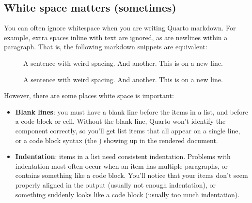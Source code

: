 \documentclass[
  letterpaper,
  DIV=11,
  numbers=noendperiod,
  oneside]{scrreprt}
\newenvironment{Shaded}{\begin{snugshade}}{\end{snugshade}}
\newcommand{\NormalTok}[1]{\textcolor[rgb]{0.00,0.23,0.31}{#1}}
\begin{document}
\begin{tcolorbox}
\subsection{White space matters
(sometimes)}\label{white-space-matters-sometimes}

You can often ignore whitespace when you are writing Quarto markdown.
For example, extra spaces inline with text are ignored, as are newlines
within a paragraph. That is, the following markdown snippets are
equivalent:

\begin{figure}[H]

\begin{minipage}[t]{0.50\linewidth}

\begin{Shaded}
\begin{Highlighting}[]
\NormalTok{A sentence  with   weird     spacing.   And    another.}
\NormalTok{This is on a new line.}
\end{Highlighting}
\end{Shaded}

\end{minipage}%
%
\begin{minipage}[t]{0.50\linewidth}

\begin{Shaded}
\begin{Highlighting}[]
\NormalTok{A sentence with weird spacing. And another. This is on a new line.}
\end{Highlighting}
\end{Shaded}

\end{minipage}%

\end{figure}%

However, there are some places white space is important:

\begin{itemize}
\item
  \textbf{Blank lines}: you must have a blank line before the items in a
  list, and before a code block or cell. Without the blank line, Quarto
  won't identify the component correctly, so you'll get list items that
  all appear on a single line, or a code block syntax (the
  \texttt{\textasciigrave{}\textasciigrave{}\textasciigrave{}}) showing
  up in the rendered document.
\item
  \textbf{Indentation}: items in a list need consistent indentation.
  Problems with indentation most often occur when an item has multiple
  paragraphs, or contains something like a code block. You'll notice
  that your items don't seem properly aligned in the output (usually not
  enough indentation), or something suddenly looks like a code block
  (usually too much indentation).
\end{itemize}


\end{tcolorbox}
\end{document}
